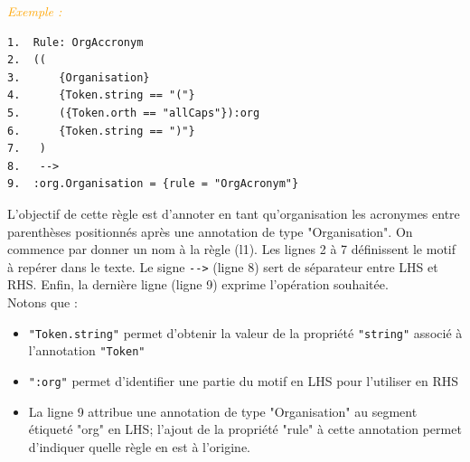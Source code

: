 \documentclass[a4paper, 11pt]{report}
\newenvironment{exemple}
    {
    \textit{\textcolor{orange}{
    Exemple : \\}}
    }
    {
    ~\\
    }
\begin{document}
\begin{exemple}
\begin{verbatim}
1.  Rule: OrgAccronym
2.  ((
3.      {Organisation}
4.      {Token.string == "("}
5.      ({Token.orth == "allCaps"}):org
6.      {Token.string == ")"}
7.   )
8.   -->
9.  :org.Organisation = {rule = "OrgAcronym"}
\end{verbatim}

L'objectif de cette règle est d'annoter en tant qu'organisation les acronymes entre parenthèses positionnés après une annotation de type "Organisation". On commence par donner un nom à la règle (l1). Les lignes 2 à 7 définissent le motif à repérer dans le texte. Le signe \verb|-->| (ligne 8) sert de séparateur entre LHS et RHS. Enfin, la dernière ligne (ligne 9) exprime l'opération souhaitée.\\
Notons que : 
\begin{itemize}
    \item \verb|"Token.string"| permet d'obtenir la valeur de la propriété \verb|"string"| associé à l'annotation \verb|"Token"|
    \item \verb|":org"| permet d'identifier une partie du motif en LHS pour l'utiliser en RHS
    \item La ligne 9 attribue une annotation de type "Organisation" au segment étiqueté "org" en LHS; l'ajout de la propriété "rule" à cette annotation permet d'indiquer quelle règle en est à l'origine.
\end{itemize}
\end{exemple}
\end{document}

